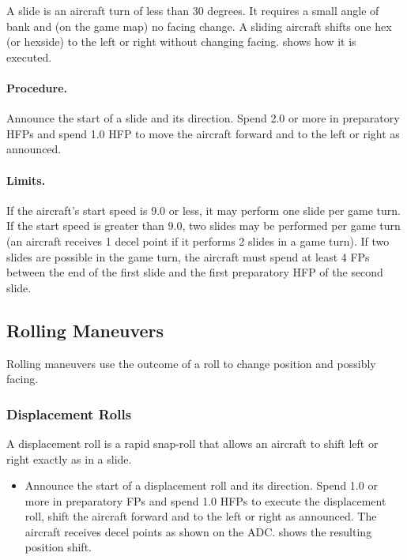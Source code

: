 


A slide is an aircraft turn of less than 30 degrees. It requires a small angle of bank and (on the game map) no facing change. A sliding aircraft shifts one hex (or hexside) to the left or right without changing facing.  shows how it is executed.

\paragraph{Procedure.} Announce the start of a slide and its direction. Spend 2.0 or more in preparatory HFPs and spend 1.0 HFP to move the aircraft forward and to the left or right as announced.

\paragraph{Limits.} If the aircraft's start speed is 9.0 or less, it may perform one slide per game turn. If the start speed is greater than 9.0, two slides may be performed per game turn (an aircraft receives 1 decel point if it performs 2 slides in a game turn). If two slides are possible in the game turn, the aircraft must spend at least 4 FPs between the end of the first slide and the first preparatory HFP of the second slide.

\subsection{Rolling Maneuvers}

Rolling maneuvers use the outcome of a roll to change position and possibly facing.

\subsubsection{Displacement Rolls}

A displacement roll is a rapid snap-roll that allows an aircraft to shift left or right exactly as in a slide.

\begin{itemize}
    \item{} Announce the start of a displacement roll and its direction. Spend 1.0 or more in preparatory FPs and spend 1.0 HFPs to execute the displacement roll, shift the aircraft forward and to the left or right as announced. The aircraft receives decel points as shown on the ADC.  shows the resulting position shift.

\end{itemize}

